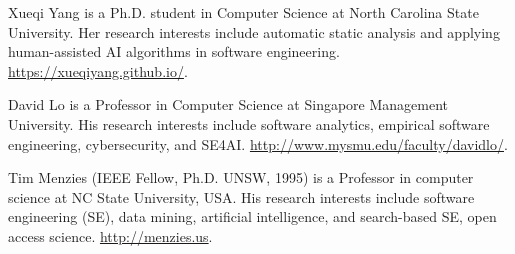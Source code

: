 \documentclass[compsoc,10pt]{IEEEtran}
\begin{document}
\vspace{-20mm}
\begin{IEEEbiography}{Xueqi Yang} is a Ph.D. student in Computer Science at North Carolina State University.  Her research interests include automatic static analysis and applying human-assisted AI algorithms in software engineering.  \url{https://xueqiyang.github.io/}.
\end{IEEEbiography}
\vspace{-20mm}
\begin{IEEEbiography}{David Lo} is a Professor in Computer Science at Singapore Management University. His research interests include software analytics, empirical software engineering, cybersecurity, and SE4AI.   \url{http://www.mysmu.edu/faculty/davidlo/}.
\end{IEEEbiography}
\vspace{-20mm}
\begin{IEEEbiography}{Tim Menzies} (IEEE Fellow, Ph.D. UNSW, 1995)
is a Professor in computer science  at NC State University, USA.
His research interests include software engineering (SE), data mining, artificial intelligence, and search-based SE, open access science.  \url{http://menzies.us}.
\end{IEEEbiography}
 
\clearpage

\setcounter{page}{1}
\normalsize
\twocolumn
\newpage
\end{document}
